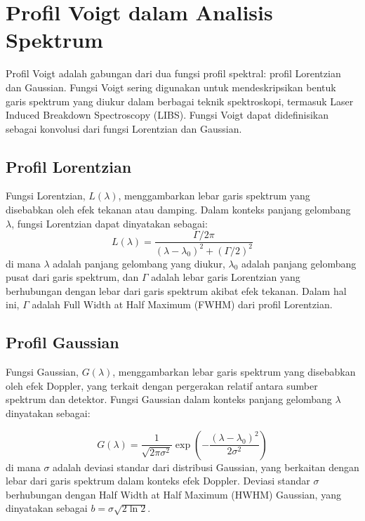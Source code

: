 \section{Profil Voigt dalam Analisis Spektrum}
\par Profil Voigt adalah gabungan dari dua fungsi profil spektral: profil Lorentzian dan Gaussian. Fungsi Voigt sering digunakan untuk mendeskripsikan bentuk garis spektrum yang diukur dalam berbagai teknik spektroskopi, termasuk Laser Induced Breakdown Spectroscopy (LIBS). Fungsi Voigt dapat didefinisikan sebagai konvolusi dari fungsi Lorentzian dan Gaussian.

\subsection{Profil Lorentzian}
\par Fungsi Lorentzian, \( L(\lambda) \), menggambarkan lebar garis spektrum yang disebabkan oleh efek tekanan atau damping. Dalam konteks panjang gelombang \( \lambda \), fungsi Lorentzian dapat dinyatakan sebagai:
\begin{equation}
L(\lambda) = \frac{\Gamma / 2\pi}{(\lambda - \lambda_0)^2 + (\Gamma / 2)^2}
\end{equation}
di mana \( \lambda \) adalah panjang gelombang yang diukur, \( \lambda_0 \) adalah panjang gelombang pusat dari garis spektrum, dan \( \Gamma \) adalah lebar garis Lorentzian yang berhubungan dengan lebar dari garis spektrum akibat efek tekanan. Dalam hal ini, \( \Gamma \) adalah Full Width at Half Maximum (FWHM) dari profil Lorentzian.

\subsection{Profil Gaussian}
\par Fungsi Gaussian, \( G(\lambda) \), menggambarkan lebar garis spektrum yang disebabkan oleh efek Doppler, yang terkait dengan pergerakan relatif antara sumber spektrum dan detektor. Fungsi Gaussian dalam konteks panjang gelombang \( \lambda \) dinyatakan sebagai:

\begin{equation}
G(\lambda) = \frac{1}{\sqrt{2\pi \sigma^2}} \exp\left(-\frac{(\lambda - \lambda_0)^2}{2\sigma^2}\right)
\end{equation}
di mana \( \sigma \) adalah deviasi standar dari distribusi Gaussian, yang berkaitan dengan lebar dari garis spektrum dalam konteks efek Doppler. Deviasi standar \( \sigma \) berhubungan dengan Half Width at Half Maximum (HWHM) Gaussian, yang dinyatakan sebagai \( b = \sigma \sqrt{2 \ln 2} \).

